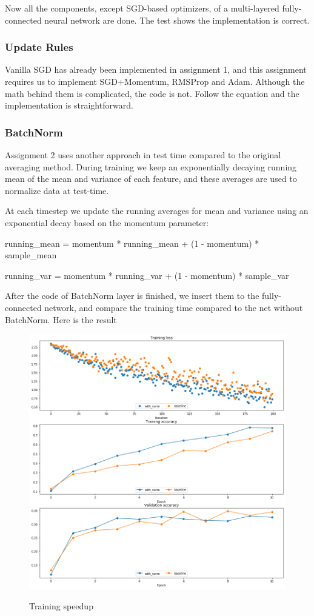 \documentclass{article} %
\begin{document}
Now all the components, except SGD-based optimizers, of a multi-layered fully-connected neural network are done. The test shows the implementation is correct.

\subsubsection{Update Rules}
Vanilla SGD has already been implemented in assignment 1, and this assignment requires us to implement SGD+Momentum, RMSProp and Adam. Although the math behind them is complicated, the code is not. Follow the equation and the implementation is straightforward.

\subsubsection{BatchNorm}
Assignment 2 uses another approach in test time compared to the original averaging method. During training we keep an exponentially decaying running mean of the mean and variance of each feature, and these averages are used to normalize data at test-time.

At each timestep we update the running averages for mean and variance using an exponential decay based on the momentum parameter:

running\_mean = momentum * running\_mean + (1 - momentum) * sample\_mean
    
running\_var = momentum * running\_var + (1 - momentum) * sample\_var

After the code of BatchNorm layer is finished, we insert them to the fully-connected network, and compare the training time compared to the net without BatchNorm. Here is the result
\begin{figure}[H]
  \centering
  \includegraphics[width=.8\textwidth]{batchnorm.png}\\
  \caption{Training speedup}\label{fig:batchnorm}
\end{figure}
\end{document}
